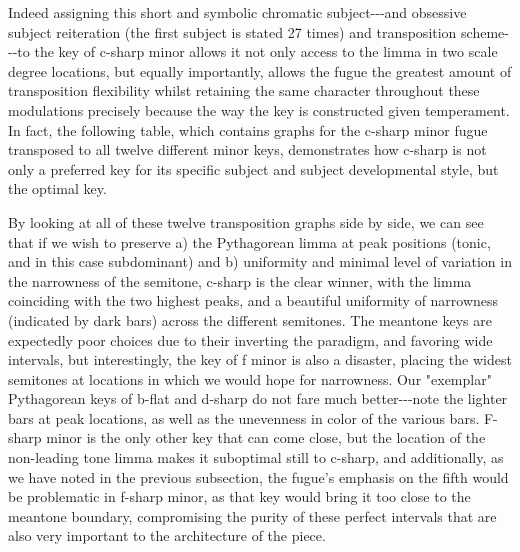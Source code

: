 Indeed assigning this short and symbolic chromatic subject-\/-\/-and
obsessive subject reiteration (the first subject is stated 27 times) and
transposition scheme-\/-\/-to the key of c-sharp minor allows it not
only access to the limma in two scale degree locations, but equally
importantly, allows the fugue the greatest amount of transposition
flexibility whilst retaining the same character throughout these
modulations precisely because the way the key is constructed given
temperament. In fact, the following table, which contains graphs for the
c-sharp minor fugue transposed to all twelve different minor keys,
demonstrates how c-sharp is not only a preferred key for its specific
subject and subject developmental style, but the optimal key.


    \begin{center}
    \end{center}
    
    By looking at all of these twelve transposition graphs side by side, we
can see that if we wish to preserve a) the Pythagorean limma at peak
positions (tonic, and in this case subdominant) and b) uniformity and
minimal level of variation in the narrowness of the semitone, c-sharp is
the clear winner, with the limma coinciding with the two highest peaks,
and a beautiful uniformity of narrowness (indicated by dark bars) across
the different semitones. The meantone keys are expectedly poor choices
due to their inverting the paradigm, and favoring wide intervals, but
interestingly, the key of f minor is also a disaster, placing the widest
semitones at locations in which we would hope for narrowness. Our
"exemplar" Pythagorean keys of b-flat and d-sharp do not fare much
better-\/-\/-note the lighter bars at peak locations, as well as the
unevenness in color of the various bars. F-sharp minor is the only other
key that can come close, but the location of the non-leading tone limma
makes it suboptimal still to c-sharp, and additionally, as we have noted
in the previous subsection, the fugue's emphasis on the fifth would be
problematic in f-sharp minor, as that key would bring it too close to
the meantone boundary, compromising the purity of these perfect
intervals that are also very important to the architecture of the piece.

